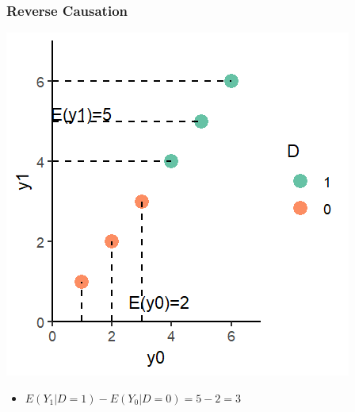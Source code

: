 \documentclass[xcolor=x11names,compress]{beamer}\usepackage[]{graphicx}\usepackage[]{color}
\makeatletter
\def\maxwidth{ %
  \ifdim\Gin@nat@width>\linewidth
    \linewidth
  \else
    \Gin@nat@width
  \fi
}
\newenvironment{knitrout}{}{} %
\renewcommand{\(}{\begin{columns}}
\renewcommand{\)}{\end{columns}}
\newcommand{\<}[1]{\begin{column}{#1}}
\renewcommand{\>}{\end{column}}
\makeatother
\begin{document}
\begin{frame}
\frametitle{Reverse Causation}
\begin{knitrout}
\color{fgcolor}
\includegraphics[width=\maxwidth]{figure/reverse6-1} 

\end{knitrout}
\begin{itemize}
\pause
\item $E(Y_1|D=1)-E(Y_0|D=0) = 5 - 2 = 3$
\end{itemize}
\end{frame}
\end{document}
